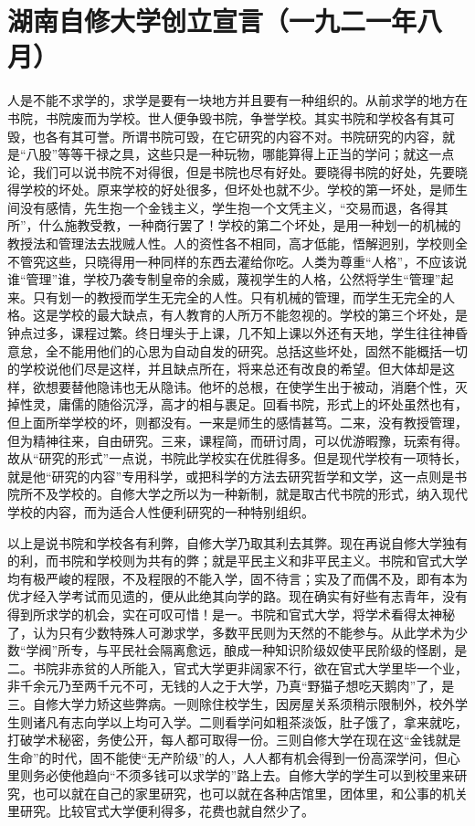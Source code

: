 \section{湖南自修大学创立宣言（一九二一年八月）}


人是不能不求学的，求学是要有一块地方并且要有一种组织的。从前求学的地方在书院，书院废而为学校。世人便争毁书院，争誉学校。其实书院和学校各有其可毁，也各有其可誉。所谓书院可毁，在它研究的内容不对。书院研究的内容，就是“八股”等等干禄之具，这些只是一种玩物，哪能算得上正当的学问；就这一点论，我们可以说书院不对得很，但是书院也尽有好处。要晓得书院的好处，先要晓得学校的坏处。原来学校的好处很多，但坏处也就不少。学校的第一坏处，是师生间没有感情，先生抱一个金钱主义，学生抱一个文凭主义，“交易而退，各得其所”，什么施教受教，一种商行罢了！学校的第二个坏处，是用一种划一的机械的教授法和管理法去戕贼人性。人的资性各不相同，高才低能，悟解迥别，学校则全不管究这些，只晓得用一种同样的东西去灌给你吃。人类为尊重“人格”，不应该说谁“管理”谁，学校乃袭专制皇帝的余威，蔑视学生的人格，公然将学生“管理”起来。只有划一的教授而学生无完全的人性。只有机械的管理，而学生无完全的人格。这是学校的最大缺点，有人教育的人所万不能忽视的。学校的第三个坏处，是钟点过多，课程过繁。终日埋头于上课，几不知上课以外还有天地，学生往往神昏意怠，全不能用他们的心思为自动自发的研究。总括这些坏处，固然不能概括一切的学校说他们尽是这样，并且缺点所在，将来总还有改良的希望。但大体却是这样，欲想要替他隐讳也无从隐讳。他坏的总根，在使学生出于被动，消磨个性，灭掉性灵，庸儒的随俗沉浮，高才的相与裹足。回看书院，形式上的坏处虽然也有，但上面所举学校的坏，则都没有。一来是师生的感情甚笃。二来，没有教授管理，但为精神往来，自由研究。三来，课程简，而研讨周，可以优游暇豫，玩索有得。故从“研究的形式”一点说，书院此学校实在优胜得多。但是现代学校有一项特长，就是他“研究的内容”专用科学，或把科学的方法去研究哲学和文学，这一点则是书院所不及学校的。自修大学之所以为一种新制，就是取古代书院的形式，纳入现代学校的内容，而为适合人性便利研究的一种特别组织。

以上是说书院和学校各有利弊，自修大学乃取其利去其弊。现在再说自修大学独有的利，而书院和学校则为共有的弊；就是平民主义和非平民主义。书院和官式大学均有极严峻的程限，不及程限的不能入学，固不待言；实及了而偶不及，即有本为优才经入学考试而见遗的，便从此绝其向学的路。现在确实有好些有志青年，没有得到所求学的机会，实在可叹可惜！是一。书院和官式大学，将学术看得太神秘了，认为只有少数特殊人可渺求学，多数平民则为天然的不能参与。从此学术为少数“学阀”所专，与平民社会隔离愈远，酿成一种知识阶级奴使平民阶级的怪剧，是二。书院非赤贫的人所能入，官式大学更非阔家不行，欲在官式大学里毕一个业，非千余元乃至两千元不可，无钱的人之于大学，乃真“野猫子想吃天鹅肉”了，是三。自修大学力矫这些弊病。一则除住校学生，因房屋关系须稍示限制外，校外学生则诸凡有志向学以上均可入学。二则看学问如粗茶淡饭，肚子饿了，拿来就吃，打破学术秘密，务使公开，每人都可取得一份。三则自修大学在现在这“金钱就是生命”的时代，固不能使“无产阶级”的人，人人都有机会得到一份高深学问，但心里则务必使他趋向“不须多钱可以求学的”路上去。自修大学的学生可以到校里来研究，也可以就在自己的家里研究，也可以就在各种店馆里，团体里，和公事的机关里研究。比较官式大学便利得多，花费也就自然少了。

